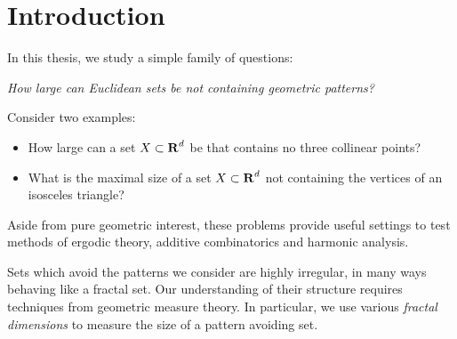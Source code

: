 
\chapter{Introduction}
\label{ch:Introduction}

In this thesis, we study a simple family of questions:
%
\begin{center}
	{\it How large can Euclidean sets be not containing geometric patterns?}
\end{center}
%
Consider two examples:
%
\begin{itemize}
    \item How large can a set $X \subset \operatorname{\mathbf{R}}^d$ be that contains no three collinear points?

    \item What is the maximal size of a set $X \subset \operatorname{\mathbf{R}}^d$ not containing the vertices of an isosceles triangle?
\end{itemize}
%
Aside from pure geometric interest, these problems provide useful settings to test methods of ergodic theory, additive combinatorics and harmonic analysis.

Sets which avoid the patterns we consider are highly irregular, in many ways behaving like a fractal set. Our understanding of their structure requires techniques from geometric measure theory. In particular, we use various \emph{fractal dimensions} to measure the size of a pattern avoiding set.




